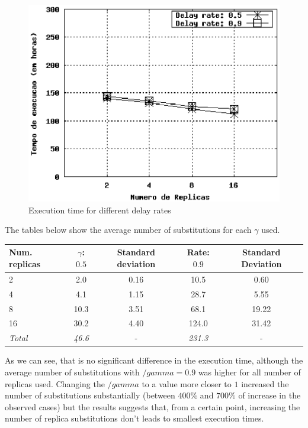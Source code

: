 \documentclass{cpeauth}
\begin{document}
\begin{figure}[th]
\centering \includegraphics[width=.5\columnwidth]{images/08-11_scenario.eps}
\caption{Execution time for different delay rates}
\label{fig:adapt-mag-3}
\end{figure}

The tables below show the average number of
substitutions for each $\gamma$ used.

\begin{table}
\label{tab:numsub6}
\centering
  \begin{tabular}{ l | c | c | c | c |}
    \hline 
    \hline 
    Num. replicas & $\gamma$: $0.5$  & Standard deviation& Rate: $0.9$  & Standard Deviation \\ \hline
        2         &     2.0          &      0.16         &     10.5     &      0.60   \\ \hline
        4         &     4.1          &      1.15         &     28.7     &      5.55   \\ \hline
        8         &    10.3          &      3.51         &     68.1     &      19.22  \\ \hline
       16         &    30.2          &      4.40         &    124.0     &      31.42  \\ \hline
    {\em Total}   &   {\em 46.6}    &        -          & {\em 231.3}  &      -       \\ \hline
  \end{tabular}
\end{table}

As we can see, that is no significant difference in the execution time,
although the average number of substitutions with $/gamma = 0.9$ was higher for
all number of replicas used. Changing the $/gamma$ to a value more closer to
$1$ increased the number of substitutions substantially (between $400\%$ and
$700\%$ of increase in the observed cases) but the results suggests that, from
a certain point, increasing the number of replica substitutions don't leads to
smallest execution times.
\end{document}
